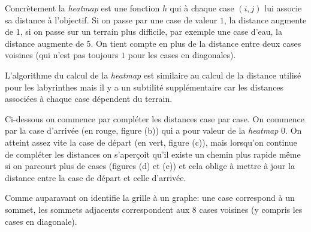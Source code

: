 \documentclass[11pt,class=report,crop=false]{standalone}
\begin{document}
Concrètement la \emph{heatmap} est une fonction $h$ qui à chaque case $(i,j)$ lui associe sa distance à l'objectif.
Si on passe par une case de valeur $1$, la distance augmente de $1$, si on passe sur un terrain plus difficile, par exemple une case d'eau, la distance augmente de $5$. On tient compte en plus de la distance entre deux cases voisines (qui n'est pas toujours $1$ pour les cases en diagonales).

L'algorithme du calcul de la \emph{heatmap} est similaire au calcul de la distance utilisé pour les labyrinthes mais il y a un subtilité supplémentaire car les distances associées à chaque case dépendent du terrain.

Ci-dessous on commence par compléter les distances case par case. On commence par la case d'arrivée (en rouge, figure (b)) qui a pour valeur de la \emph{heatmap} $0$. On atteint assez vite la case de départ (en vert, figure (c)), mais lorsqu'on continue de compléter les distances on s'aperçoit qu'il existe un chemin plus rapide même si on parcourt plus de cases (figures (d) et (e)) et cela oblige à mettre à jour la distance entre la case de départ et celle d'arrivée.



Comme auparavant on identifie la grille à un graphe: une case correspond à un sommet, les sommets adjacents correspondent aux $8$ cases voisines (y compris les cases en diagonale).
\end{document}

